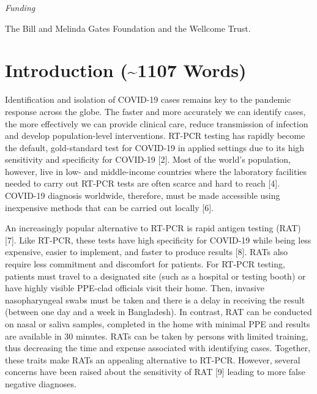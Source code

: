 \documentclass[]{elsarticle} %
\begin{document}
\emph{Funding}

The Bill and Melinda Gates Foundation and the Wellcome Trust.

\hypertarget{introduction-1107-words}{%
\section{Introduction (\textasciitilde1107 Words)}\label{introduction-1107-words}}

Identification and isolation of COVID-19 cases remains key to the pandemic response across the globe.
The faster and more accurately we can identify cases, the more effectively we can provide clinical care, reduce transmission of infection and develop population-level interventions.
RT-PCR testing has rapidly become the default, gold-standard test for COVID-19 in applied settings due to its high sensitivity and specificity for COVID-19 {[}2{]}.
Most of the world's population, however, live in low- and middle-income countries where the laboratory facilities needed to carry out RT-PCR tests are often scarce and hard to reach {[}4{]}.
COVID-19 diagnosis worldwide, therefore, must be made accessible using inexpensive methods that can be carried out locally {[}6{]}.

An increasingly popular alternative to RT-PCR is rapid antigen testing (RAT) {[}7{]}.
Like RT-PCR, these tests have high specificity for COVID-19 while being less expensive, easier to implement, and faster to produce results {[}8{]}.
RATs also require less commitment and discomfort for patients.
For RT-PCR testing, patients must travel to a designated site (such as a hospital or testing booth) or have highly visible PPE-clad officials visit their home.
Then, invasive nasopharyngeal swabs must be taken and there is a delay in receiving the result (between one day and a week in Bangladesh).
In contrast, RAT can be conducted on nasal or saliva samples, completed in the home with minimal PPE and results are available in 30 minutes.
RATs can be taken by persons with limited training, thus decreasing the time and expense associated with identifying cases.
Together, these traits make RATs an appealing alternative to RT-PCR.
However, several concerns have been raised about the sensitivity of RAT {[}9{]} leading to more false negative diagnoses.
\end{document}
